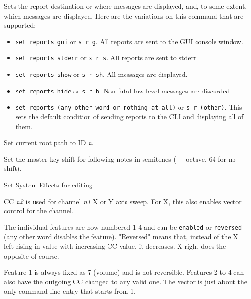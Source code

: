       Sets the report destination or where messages are displayed, and, to some
      extent, which messages are displayed.  Here are the variations on this
      command that are supported:

      \begin{itemize}
         \item \texttt{set reports gui} or \texttt{s r g}.
            All reports are sent to the GUI console window.
         \item \texttt{set reports stderr} or \texttt{s r s}.
            All reports are sent to stderr.
         \item \texttt{set reports show} or \texttt{s r sh}.
            All messages are displayed.
         \item \texttt{set reports hide} or \texttt{s r h}.
            Non fatal low-level messages are discarded.
         \item \texttt{set reports (any other word or nothing at all)} or
            \texttt{s r (other)}.
            This sets the default condition of sending reports to the CLI and
            displaying all of them.
      \end{itemize}

      Set current root path to ID \textsl{n}.

      Set the master key shift for following notes in semitones (+-
      octave, 64 for no shift).

      Set System Effects for editing.

      CC \textsl{n2} is used for channel \textsl{n1} X or Y axis sweep.
      For X, this also enables vector control for the channel.

      The individual features are now numbered 1-4 and can be
       \texttt{enabled} or
       \texttt{reversed} (any
      other word disables the feature).
      "Reversed" means that, instead of the X left rising in
      value with increasing CC value, it decreases.
      X right does the opposite of course.

      Feature 1 is always fixed as 7 (volume) and is not reversible.
      Features 2 to 4 can also have the outgoing CC changed to any valid one.
      The vector is just about the only command-line
      entry that starts from 1.

